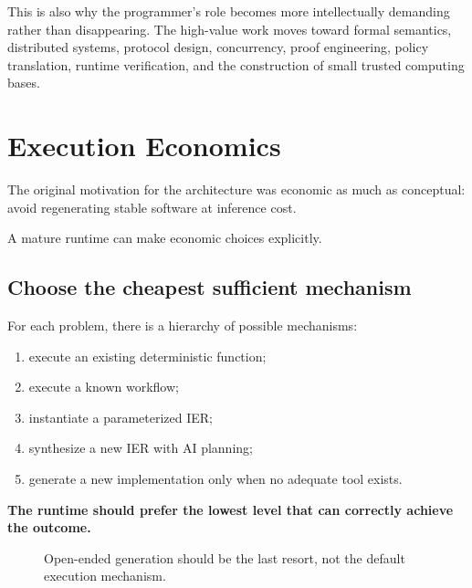 \documentclass[10pt,oneside,openany]{book}
\begin{document}
This is also why the programmer's role becomes more intellectually demanding rather than disappearing. The high-value work moves toward formal semantics, distributed systems, protocol design, concurrency, proof engineering, policy translation, runtime verification, and the construction of small trusted computing bases.

\chapter{Execution Economics}

The original motivation for the architecture was economic as much as conceptual: avoid regenerating stable software at inference cost.

A mature runtime can make economic choices explicitly.

\section{Choose the cheapest sufficient mechanism}
For each problem, there is a hierarchy of possible mechanisms:

\begin{enumerate}
\item execute an existing deterministic function;
\item execute a known workflow;
\item instantiate a parameterized IER;
\item synthesize a new IER with AI planning;
\item generate a new implementation only when no adequate tool exists.
\end{enumerate}

\textbf{The runtime should prefer the lowest level that can correctly achieve the outcome.}

\begin{figure}[ht]
\centering
{}
\caption{Open-ended generation should be the last resort, not the default execution mechanism.}
\end{figure}
\end{document}
